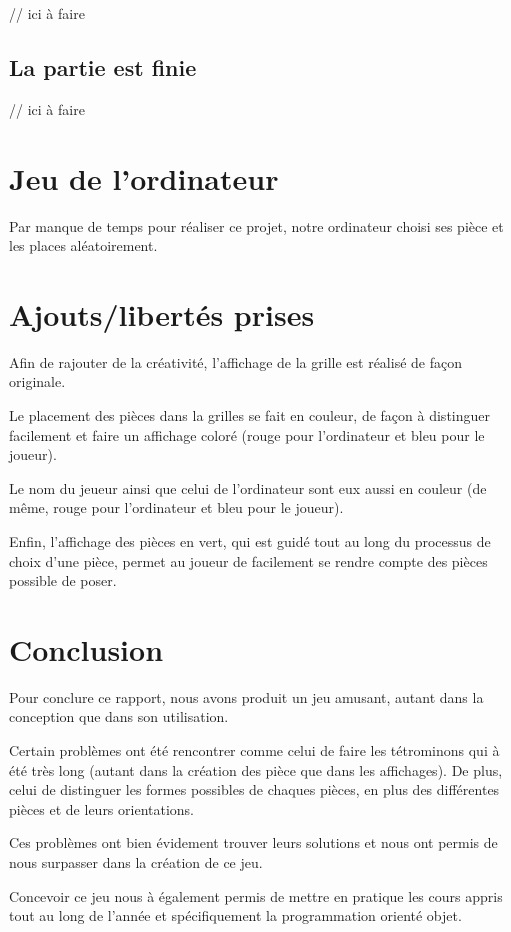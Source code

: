 \documentclass[a4paper, titlepage, french]{report}
\begin{document}
\color{red}
// ici à faire
\color{black}


\section{La partie est finie}

\color{red}
// ici à faire
\color{black}


\chapter{Jeu de l'ordinateur}

Par manque de temps pour réaliser ce projet, notre ordinateur choisi ses pièce et les places aléatoirement.
\chapter{Ajouts/libertés prises}

Afin de rajouter de la créativité, l'affichage de la grille est réalisé de façon originale.
\bigskip

Le placement des pièces dans la grilles se fait en couleur, de façon à distinguer facilement et faire un affichage coloré (rouge pour l'ordinateur et bleu pour le joueur).
\bigskip

Le nom du jeueur ainsi que celui de l'ordinateur sont eux aussi en couleur (de même, rouge pour l'ordinateur et bleu pour le joueur).
\bigskip

Enfin, l'affichage des pièces en vert, qui est guidé tout au long du processus de choix d'une pièce, permet au joueur de facilement se rendre compte des pièces possible de poser.


\chapter{Conclusion}

Pour conclure ce rapport, nous avons produit un jeu amusant, autant dans la conception que dans son utilisation.
\bigskip

Certain problèmes ont été rencontrer comme celui de faire les tétrominons qui à été très long (autant dans la création des pièce que dans les affichages).
De plus, celui de distinguer les formes possibles de chaques pièces, en plus des différentes pièces et de leurs orientations.
\bigskip

Ces problèmes ont bien évidement trouver leurs solutions et nous ont permis de nous surpasser dans la création de ce jeu.
\bigskip

Concevoir ce jeu nous à également permis de mettre en pratique les cours appris tout au long de l'année et spécifiquement la programmation orienté objet.
\end{document}
